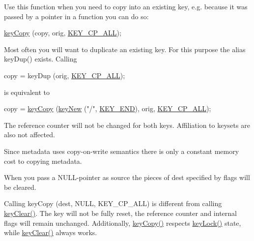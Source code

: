 Use this function when you need to copy into an existing key, e.\+g. because it was passed by a pointer in a function you can do so\+:


\begin{DoxyCodeInclude}
\hyperlink{group__key_ga505575ebef060066984fe0f590081e37}{keyCopy} (copy, orig, \hyperlink{group__key_gga9ff42b1e9a97222562bfda3dd1f8c735a3e04e17514f102f1e9217308d44e7612}{KEY\_CP\_ALL});
\end{DoxyCodeInclude}
 Most often you will want to duplicate an existing key. For this purpose the alias key\+Dup() exists. Calling


\begin{DoxyCodeInclude}
copy = keyDup (orig, \hyperlink{group__key_gga9ff42b1e9a97222562bfda3dd1f8c735a3e04e17514f102f1e9217308d44e7612}{KEY\_CP\_ALL});
\end{DoxyCodeInclude}
 is equivalent to


\begin{DoxyCodeInclude}
copy = \hyperlink{group__key_ga505575ebef060066984fe0f590081e37}{keyCopy} (\hyperlink{group__key_gad23c65b44bf48d773759e1f9a4d43b89}{keyNew} (\textcolor{stringliteral}{"/"}, \hyperlink{group__key_gga9b703ca49f48b482def322b77d3e6bc8aa8adb6fcb92dec58fb19410eacfdd403}{KEY\_END}), orig, \hyperlink{group__key_gga9ff42b1e9a97222562bfda3dd1f8c735a3e04e17514f102f1e9217308d44e7612}{KEY\_CP\_ALL});
\end{DoxyCodeInclude}
 The reference counter will not be changed for both keys. Affiliation to keysets are also not affected.

Since metadata uses copy-\/on-\/write semantics there is only a constant memory cost to copying metadata.

When you pass a N\+U\+L\+L-\/pointer as {\ttfamily source} the pieces of {\ttfamily dest} specified by {\ttfamily flags} will be cleared.

Calling {\ttfamily key\+Copy (dest, N\+U\+LL, K\+E\+Y\+\_\+\+C\+P\+\_\+\+A\+LL)} is different from calling \hyperlink{group__key_gab2242311a36bbc0520e0d36895107ec1}{key\+Clear()}. The key will not be fully reset, the reference counter and internal flags will remain unchanged. Additionally, \hyperlink{group__key_ga505575ebef060066984fe0f590081e37}{key\+Copy()} respects \hyperlink{group__key_ga5e42b653a0f117be7f1f6eb06c569bb8}{key\+Lock()} state, while \hyperlink{group__key_gab2242311a36bbc0520e0d36895107ec1}{key\+Clear()} always works.


